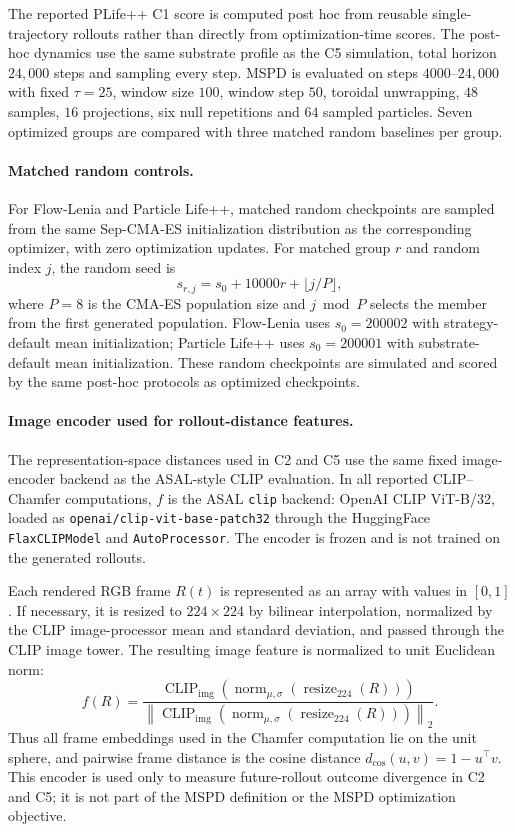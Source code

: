 The reported PLife++ C1 score is computed post hoc from reusable single-trajectory rollouts rather than directly from optimization-time scores.  The post-hoc dynamics use the same substrate profile as the C5 simulation, total horizon $24{,}000$ steps and sampling every step.  MSPD is evaluated on steps $4000$--$24{,}000$ with fixed $\tau=25$, window size $100$, window step $50$, toroidal unwrapping, $48$ samples, $16$ projections, six null repetitions and $64$ sampled particles.  Seven optimized groups are compared with three matched random baselines per group.

\paragraph{Matched random controls.}
For Flow-Lenia and Particle Life++, matched random checkpoints are sampled from the same Sep-CMA-ES initialization distribution as the corresponding optimizer, with zero optimization updates.  For matched group $r$ and random index $j$, the random seed is
\[
  s_{r,j}=s_0+10000r+\lfloor j/P\rfloor,
\]
where $P=8$ is the CMA-ES population size and $j\bmod P$ selects the member from the first generated population.  Flow-Lenia uses $s_0=200002$ with strategy-default mean initialization; Particle Life++ uses $s_0=200001$ with substrate-default mean initialization.  These random checkpoints are simulated and scored by the same post-hoc protocols as optimized checkpoints.

\paragraph{Image encoder used for rollout-distance features.}
\label{app:encoder-description}
The representation-space distances used in C2 and C5 use the same fixed image-encoder backend as the ASAL-style CLIP evaluation.  In all reported CLIP--Chamfer computations, $f$ is the ASAL \texttt{clip} backend: OpenAI CLIP ViT-B/32, loaded as \texttt{openai/clip-vit-base-patch32} through the HuggingFace \texttt{FlaxCLIPModel} and \texttt{AutoProcessor}.  The encoder is frozen and is not trained on the generated rollouts.

Each rendered RGB frame $R(t)$ is represented as an array with values in $[0,1]$.  If necessary, it is resized to $224\times224$ by bilinear interpolation, normalized by the CLIP image-processor mean and standard deviation, and passed through the CLIP image tower.  The resulting image feature is normalized to unit Euclidean norm:
\[
  f(R)
  =
  \frac{\operatorname{CLIP}_{\mathrm{img}}\!\left(
  \operatorname{norm}_{\mu,\sigma}\!\left(
  \operatorname{resize}_{224}(R)
  \right)\right)}
  {\left\|
  \operatorname{CLIP}_{\mathrm{img}}\!\left(
  \operatorname{norm}_{\mu,\sigma}\!\left(
  \operatorname{resize}_{224}(R)
  \right)\right)
  \right\|_2}.
\]
Thus all frame embeddings used in the Chamfer computation lie on the unit sphere, and pairwise frame distance is the cosine distance $d_{\cos}(u,v)=1-u^\top v$.  This encoder is used only to measure future-rollout outcome divergence in C2 and C5; it is not part of the MSPD definition or the MSPD optimization objective.

